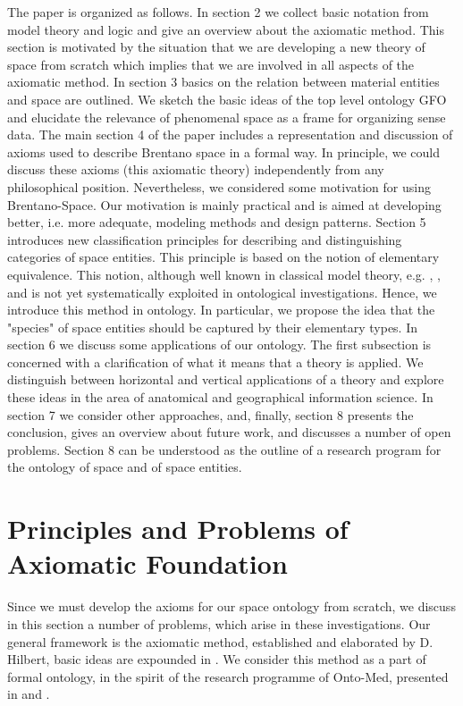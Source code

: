 \documentclass{ao2e}
\begin{document}
The paper is organized as follows. In section 2 we collect basic notation from model theory and logic and give an overview about the axiomatic method. This section is motivated by the situation that we are developing a new theory of space from scratch which implies that we are involved in all aspects of the axiomatic method. In section 3 basics on the relation between material entities and space are outlined. We sketch the basic ideas of the top level ontology GFO and elucidate the relevance of phenomenal space as a frame for organizing
sense data. 
 The main section 4 of the paper includes a representation and discussion of axioms used to describe Brentano space in a formal way. In principle, we could discuss these axioms (this axiomatic theory) independently from any philosophical  position. Nevertheless, we considered some motivation for using Brentano-Space. Our motivation is mainly practical and is aimed at developing better, i.e. more adequate, modeling methods and design patterns.  Section 5 introduces
new classification principles for describing and distinguishing categories of space entities. This principle is
based on the notion of elementary equivalence. This notion, although well known in classical model theory, e.g.  \cite{chang-cc-1977-a}, \cite{hodges-w-1993-a}, \cite{enderton-hb-1972-a} and
\cite{barwise-j-1985-a} is not yet systematically exploited in ontological investigations. Hence, we introduce this method in ontology. In particular, we propose the idea that the "species" of space entities should be captured by their elementary types. In section 6 we discuss some applications of our ontology. The first subsection is concerned with a clarification of what it means that a theory is applied. We distinguish between
horizontal and vertical applications of a theory and explore these ideas in the area of anatomical and geographical information science.  In section 7 we consider other approaches, and, finally, section 8 presents the conclusion, gives an overview about future work, and discusses a number of open problems. Section 8 can be understood 
as the outline of a research program for the ontology of space and of space entities.
\section{Principles and Problems of Axiomatic Foundation}  
Since we must develop the axioms for our space ontology from scratch, we discuss in this section a number of problems, which arise in these investigations. Our general framework is the axiomatic method, established
and elaborated by D. Hilbert, basic ideas are expounded in  \cite{hilbert-d-1918-a}. We consider this method as a part of formal ontology,
in the spirit of the research programme of Onto-Med, presented in \cite{herre-h-2010-a, herre-h-2002-a} and \cite{herre-h-2007-a}.
\end{document}
